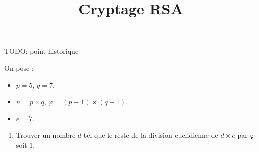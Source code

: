 \documentclass[
	classe=$2^{de}$,
	headerTitle=Activité
]{exercice}
\title{Cryptage RSA}
\begin{document}
	
\maketitle

TODO: point historique

On pose :
\begin{itemize}
	\item $p = 5$, $q = 7$.
	\item $n = p × q$, $φ = (p - 1) × (q - 1)$.
	\item $e = 7$.
\end{itemize}

\begin{enumerate}
	\item Trouver un nombre $d$ tel que le reste de la division euclidienne de $d × e$ par $φ$ soit $1$.
\end{enumerate}
\end{document}
